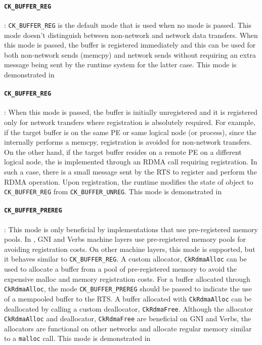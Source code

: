 \paragraph{{\tt CK\_BUFFER\_REG}}:
{\tt CK\_BUFFER\_REG} is the default mode that
is used when no mode is passed. This mode doesn't distinguish between
non-network and network data transfers. When this mode is passed, the buffer
is registered immediately and this can be used for both non-network sends (memcpy)
and network sends without requiring an extra message being sent by the runtime system
for the latter case. This mode is demonstrated in

\paragraph{{\tt CK\_BUFFER\_REG}}:
When this mode is passed, the buffer is initially unregistered and it is
registered only for network transfers where registration is absolutely required.
For example, if the target buffer is on the same PE or same logical node (or process),
since the  internally performs a memcpy, registration is avoided for non-network
transfers. On the other hand, if the target buffer resides on a remote PE on a different
logical node, the  is implemented through an RDMA call requiring registration.
In such a case, there is a small message sent by the RTS to register and perform
the RDMA operation. Upon registration, the runtime modifies the state of 
object to {\tt CK\_BUFFER\_REG} from {\tt CK\_BUFFER\_UNREG}. This mode is demonstrated in

\paragraph{{\tt CK\_BUFFER\_PREREG}}:
This mode is only beneficial by implementations that use pre-registered memory pools.
In \charmpp{}, GNI and Verbs machine layers use pre-registered memory pools for avoiding
registration costs. On other machine layers, this mode is supported, but it behaves similar
to {\tt CK\_BUFFER\_REG}. A custom allocator, \texttt{CkRdmaAlloc}
can be used to allocate a buffer from a pool of pre-registered memory to avoid the expensive malloc
and memory registration costs. For a buffer allocated through \texttt{CkRdmaAlloc}, the mode
{\tt CK\_BUFFER\_PREREG} should be passed to indicate the use of a
mempooled buffer to the RTS. A buffer allocated with \texttt{CkRdmaAlloc} can be deallocated by
calling a custom deallocator, \texttt{CkRdmaFree}. Although the allocator \texttt{CkRdmaAlloc} and
deallocator, \texttt{CkRdmaFree} are beneficial on GNI and Verbs, the allocators are functional on other
networks and allocate regular memory similar to a \texttt{malloc} call. This mode is demonstrated in


